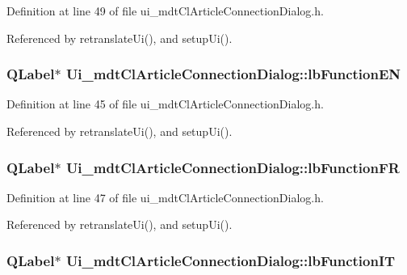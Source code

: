 Definition at line 49 of file ui\-\_\-mdt\-Cl\-Article\-Connection\-Dialog.\-h.



Referenced by retranslate\-Ui(), and setup\-Ui().

\hypertarget{class_ui__mdt_cl_article_connection_dialog_a6bb4e8f98dce0a2689f6411664132168}{
\subsubsection[{lb\-Function\-E\-N}]{\setlength{\rightskip}{0pt plus 5cm}Q\-Label$\ast$ Ui\-\_\-mdt\-Cl\-Article\-Connection\-Dialog\-::lb\-Function\-E\-N}}\label{class_ui__mdt_cl_article_connection_dialog_a6bb4e8f98dce0a2689f6411664132168}


Definition at line 45 of file ui\-\_\-mdt\-Cl\-Article\-Connection\-Dialog.\-h.



Referenced by retranslate\-Ui(), and setup\-Ui().

\hypertarget{class_ui__mdt_cl_article_connection_dialog_aa2d977b6c77e6a707dfdd4a6fbf301de}{
\subsubsection[{lb\-Function\-F\-R}]{\setlength{\rightskip}{0pt plus 5cm}Q\-Label$\ast$ Ui\-\_\-mdt\-Cl\-Article\-Connection\-Dialog\-::lb\-Function\-F\-R}}\label{class_ui__mdt_cl_article_connection_dialog_aa2d977b6c77e6a707dfdd4a6fbf301de}


Definition at line 47 of file ui\-\_\-mdt\-Cl\-Article\-Connection\-Dialog.\-h.



Referenced by retranslate\-Ui(), and setup\-Ui().

\hypertarget{class_ui__mdt_cl_article_connection_dialog_a1274e56a32c9a61f93e920b09b7bd3f7}{
\subsubsection[{lb\-Function\-I\-T}]{\setlength{\rightskip}{0pt plus 5cm}Q\-Label$\ast$ Ui\-\_\-mdt\-Cl\-Article\-Connection\-Dialog\-::lb\-Function\-I\-T}}\label{class_ui__mdt_cl_article_connection_dialog_a1274e56a32c9a61f93e920b09b7bd3f7}


